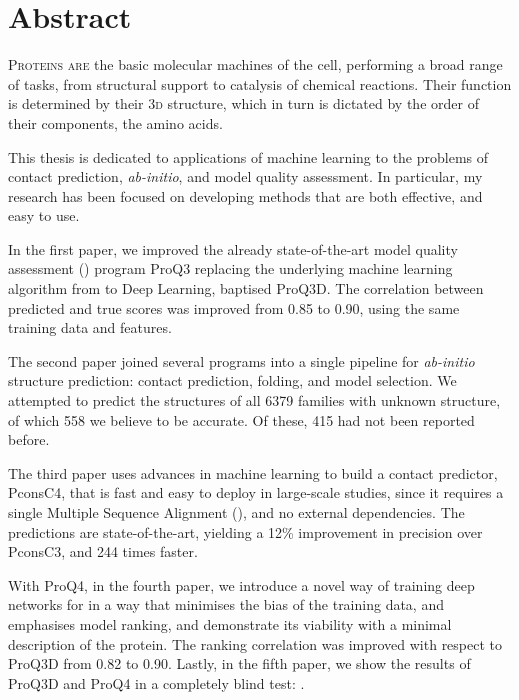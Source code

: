 \chapter*{Abstract}
\lettrine[lines=3, lhang=0.15, nindent=0em, findent=2pt]{\color{Maroon}P}{roteins are }
the basic molecular machines of the cell, performing a broad range of tasks, from structural support to catalysis of chemical reactions.
Their function is determined by their \textsc{3d} structure, which in turn is dictated by the order of their components, the amino acids.

This thesis is dedicated to applications of machine learning to the problems of contact prediction, \emph{ab-initio}, and model quality assessment.
In particular, my research has been focused on developing methods that are both effective, and easy to use.

In the first paper, we improved the already state-of-the-art model quality assessment (\MQA) program ProQ3 replacing the underlying machine learning algorithm from \SVM{} to Deep Learning, baptised ProQ3D.
The correlation between predicted and true scores was improved from 0.85 to 0.90, using the same training data and features.

The second paper joined several programs into a single pipeline for \emph{ab-initio} structure prediction: contact prediction, folding, and model selection.
We attempted to predict the structures of all 6379 \PFAM{} families with unknown structure, of which 558 we believe to be accurate.
Of these, 415 had not been reported before.

The third paper uses advances in machine learning to build a contact predictor, PconsC4, that is fast and easy to deploy in large-scale studies, since it requires a single Multiple Sequence Alignment (\MSA), and no external dependencies.
The predictions are state-of-the-art, yielding a 12\% improvement in precision over PconsC3, and 244 times faster.

With ProQ4, in the fourth paper, we introduce a novel way of training deep networks for \MQA{} in a way that minimises the bias of the training data, and emphasises model ranking, and demonstrate its viability with a minimal description of the protein.
The ranking correlation was improved with respect to ProQ3D from 0.82 to 0.90.
Lastly, in the fifth paper, we show the results of ProQ3D and ProQ4 in a completely blind test: .
